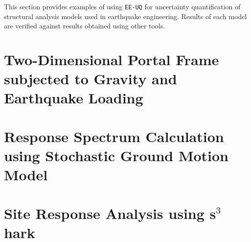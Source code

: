 This section provides examples of using \texttt{EE-UQ} for uncertainty
quantification of structural analysis models used in earthquake
engineering. Results of each model are verified against results
obtained using other tools.

\section{Two-Dimensional Portal Frame subjected to Gravity and Earthquake Loading}


\section{Response Spectrum Calculation using Stochastic Ground Motion Model}


\section{Site Response Analysis using s$^3$hark}

